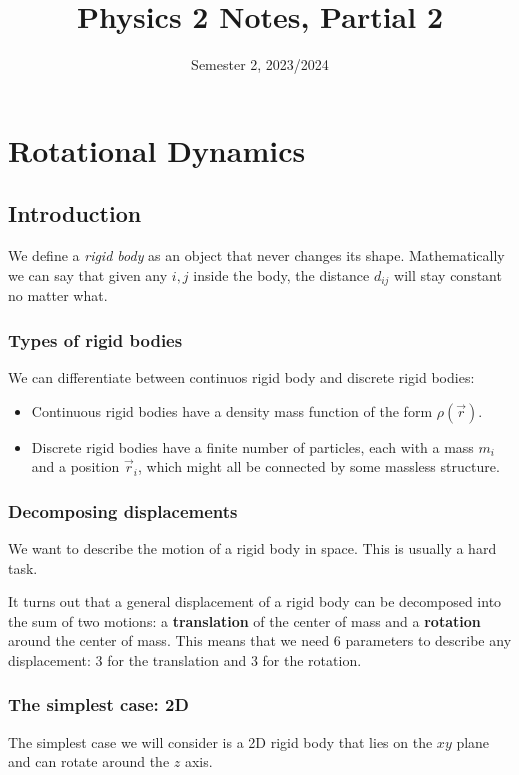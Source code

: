 \documentclass[12pt]{extarticle}
\title{Physics 2 Notes, Partial 2}
\date{Semester 2, 2023/2024}
\begin{document}
\firstpage

\section{Rotational Dynamics}

\subsection{Introduction}

We define a \emph{rigid body} as an object that never changes its shape.
Mathematically we can say that given any $i, j$ inside the body, the distance $d_{ij}$ will stay constant no matter what.

\subsubsection{Types of rigid bodies}

We can differentiate between continuos rigid body and discrete rigid bodies:
\begin{itemize}
    \item Continuous rigid bodies have a density mass function of the form $\rho(\vec{r})$.
    \item Discrete rigid bodies have a finite number of particles, each with a mass $m_i$ and a position $\vec{r}_i$, which might all be connected by some massless structure.
\end{itemize}

\subsubsection{Decomposing displacements}

We want to describe the motion of a rigid body in space. This is usually a hard task.

It turns out that a general displacement of a rigid body can be decomposed into the sum of two motions: a \textbf{translation} of the center of mass and a \textbf{rotation} around the center of mass.
This means that we need 6 parameters to describe any displacement: 3 for the translation and 3 for the rotation.

\subsubsection{The simplest case: 2D}

The simplest case we will consider is a 2D rigid body that lies on the $xy$ plane and can rotate around the $z$ axis.
\end{document}

